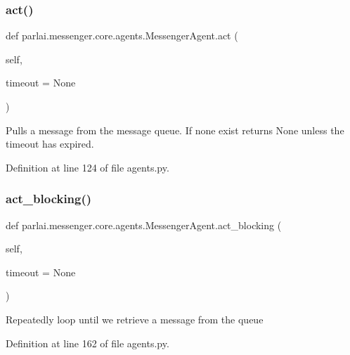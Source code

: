 \subsubsection{\texorpdfstring{act()}{act()}}
{\footnotesize\ttfamily def parlai.\+messenger.\+core.\+agents.\+Messenger\+Agent.\+act (\begin{DoxyParamCaption}\item[{}]{self,  }\item[{}]{timeout = {\ttfamily None} }\end{DoxyParamCaption})}

\begin{DoxyVerb}Pulls a message from the message queue. If none exist returns None
unless the timeout has expired.
\end{DoxyVerb}
 

Definition at line 124 of file agents.\+py.

\mbox{\label{classparlai_1_1messenger_1_1core_1_1agents_1_1MessengerAgent_a50d76f90d1926c160d96e621403b7598}} 
\subsubsection{\texorpdfstring{act\+\_\+blocking()}{act\_blocking()}}
{\footnotesize\ttfamily def parlai.\+messenger.\+core.\+agents.\+Messenger\+Agent.\+act\+\_\+blocking (\begin{DoxyParamCaption}\item[{}]{self,  }\item[{}]{timeout = {\ttfamily None} }\end{DoxyParamCaption})}

\begin{DoxyVerb}Repeatedly loop until we retrieve a message from the queue\end{DoxyVerb}
 

Definition at line 162 of file agents.\+py.



